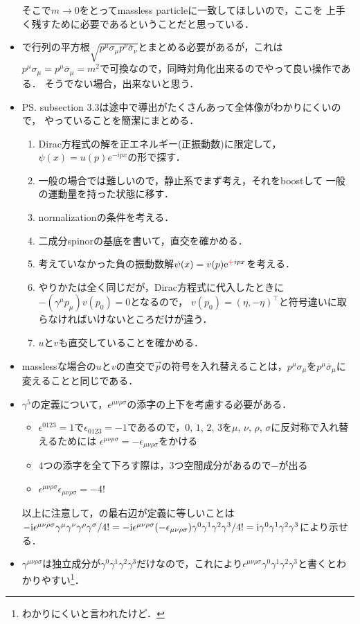 \begin{itemize}
		そこで$m\to0$をとってmassless particleに一致してほしいので，ここを
		上手く残すために必要であるということだと思っている．
	\item {}で行列の平方根$\sqrt{p^{\mu}\sigma_{\mu} p^{\nu} \bar{\sigma}_{\nu}}$とまとめる必要があるが，これは$p^{\mu}\sigma_{\mu} = p^{\mu}\bar{\sigma}_{\mu}= m^2$で可換なので，同時対角化出来るのでやって良い操作である．
		そうでない場合，出来ないと思う．
	\item PS. subsection 3.3は途中で導出がたくさんあって全体像がわかりにくいので，
		やっていることを簡潔にまとめる．
		\begin{enumerate}
			\item Dirac方程式の解を正エネルギー(正振動数)に限定して，$\psi(x) = u(p)e^{-ipx}$の形で探す．
			\item 一般の場合では難しいので，静止系でまず考え，それをboostして
				一般の運動量を持った状態に移す．
			\item normalizationの条件を考える．
			\item 二成分spinorの基底を書いて，直交を確かめる．
			\item 考えていなかった負の振動数解$\psi(x) = v(p)\mathrm{e}^{\textcolor{red}{+}ipx}$を考える．
			\item やりかたは全く同じだが，Dirac方程式に代入したときに$-(\gamma^{\mu}p_{\mu})v(p_0) = 0$となるので，
				$v(p_0)=(\eta, -\eta)^{\top}$と符号違いに取らなければいけないところだけが違う．
			\item $u$と$v$も直交していることを確かめる．
		\end{enumerate}
	\item masslessな場合の$u$と$v$の直交で$\vec{p}$の符号を入れ替えることは，$p^{\mu}\sigma_{\mu}$を$p^{\mu}\bar{\sigma}_{\mu}$に変えることと同じである．
	\item $\gamma^5$の定義について，$\epsilon^{\mu\nu\rho\sigma}$の添字の上下を考慮する必要がある．
		\begin{itemize}
			\item $\epsilon^{0123} = 1$で$\epsilon_{0123} = -1$であるので，$0$, $1$, $2$, $3$を$\mu$, $\nu$, $\rho$, $\sigma$に反対称で入れ替えるためには
			$\epsilon^{\mu\nu\rho\sigma} = -\epsilon_{\mu\nu\rho\sigma}$をかける		
		\item $4$つの添字を全て下ろす際は，$3$つ空間成分があるので$-$が出る		\item $\epsilon^{\mu\nu\rho\sigma}\epsilon_{\mu\nu\rho\sigma} = -4!$

		\end{itemize}
		以上に注意して，の最右辺が定義に等しいことは
		$-\mathrm{i}\epsilon^{\mu\nu\rho\sigma}\gamma^{\mu}\gamma^{\nu}\gamma^{\rho}\gamma^{\sigma}/4! = -\mathrm{i}\epsilon^{\mu\nu\rho\sigma}(-\epsilon_{\mu\nu\rho\sigma})\gamma^{0}\gamma^{1}\gamma^{2}\gamma^{3}/4! = \mathrm{i}\gamma^{0}\gamma^{1}\gamma^{2}\gamma^{3}$により示せる．
	\item $\gamma^{\mu\nu\rho\sigma}$は独立成分が$\gamma^{0}\gamma^{1}\gamma^{2}\gamma^{3}$だけなので，これにより$\epsilon^{\mu\nu\rho\sigma}\gamma^{0}\gamma^{1}\gamma^{2}\gamma^{3}$と書くとわかりやすい\footnote{わかりにくいと言われたけど．}．


\end{itemize}
